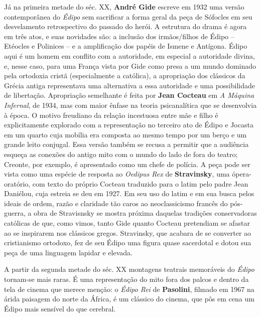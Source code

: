 Já na primeira metade do séc. XX, \textbf{André Gide} escreve em 1932
uma versão contemporânea do \emph{Édipo} sem sacrificar a forma geral da
peça de Sófocles em seu desvelamento retrospectivo do passado do herói.
A estrutura do drama é agora em três atos, e suas novidades são: a
inclusão dos irmãos/filhos de Édipo -- Etéocles e Polinices -- e a
amplificação dos papéis de Ismene e Antígona. Édipo aqui é um homem em
conflito com a autoridade, em especial a autoridade divina, e, nesse
caso, para uma França vista por Gide como presa a um mundo dominado pela
ortodoxia cristã (especialmente a católica), a apropriação dos clássicos
da Grécia antiga representava uma alternativa a essa autoridade e uma
possibilidade de libertação. Apropriação semelhante é feita por
\textbf{Jean Cocteau} em \emph{A Máquina Infernal}, de 1934, mas com
maior ênfase na teoria psicanalítica que se desenvolvia à época. O
motivo freudiano da relação incestuosa entre mãe e filho é
explicitamente explorado com a representação no terceiro ato de Édipo e
Jocasta em um quarto cuja mobília era composta ao mesmo tempo por um
berço e um grande leito conjugal. Essa versão também se recusa a
permitir que a audiência esqueça as conexões do antigo mito com o mundo
do lado de fora do teatro; Creonte, por exemplo, é apresentado como um
chefe de polícia. A peça pode ser vista como uma espécie de resposta ao
\emph{Oedipus Rex} de \textbf{Stravinsky}, uma ópera-oratório, com texto
do próprio Cocteau traduzido para o latim pelo padre Jean Daniélou, cuja
estreia se deu em 1927. Em seu uso do latim e em sua busca pelos ideais
de ordem, razão e claridade tão caros ao neoclassicismo francês do
pós-guerra, a obra de Stravisnsky se mostra próxima daquelas tradições
conservadoras católicas de que, como vimos, tanto Gide quanto Cocteau
pretendiam se afastar ao se inspirarem nos clássicos gregos. Stravinsky,
que acabara de se converter ao cristianismo ortodoxo, fez de seu Édipo
uma figura quase sacerdotal e dotou sua peça de uma linguagem lapidar e
elevada.

A partir da segunda metade do séc. XX montagens teatrais memoráveis do
\emph{Édipo} tornam-se mais raras. É uma representação do mito fora dos
palcos e dentro da tela de cinema que merece menção: o \emph{Édipo Rei}
de \textbf{Pasolini}, filmado em 1967 na árida paisagem do norte da
África, é um clássico do cinema, que pôs em cena um Édipo mais sensível
do que cerebral.

